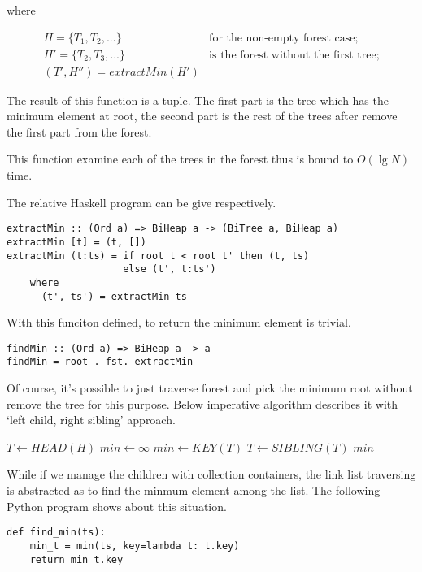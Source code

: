 \documentclass{article}
\begin{document}
where

\[
  \begin{array}{lr}
  H = \{ T_1, T_2, ...\} & \text{for the non-empty forest case;} \\
  H' = \{ T_2, T_3, ...\} & \text{is the forest without the first tree;} \\
  (T', H'') = extractMin(H')
  \end{array}
\]

The result of this function is a tuple. The first part is the 
tree which has the minimum element at root, the second part is
the rest of the trees after remove the first part from the forest.

This function examine each of the trees in the forest thus is bound
to $O(\lg N)$ time.

The relative Haskell program can be give respectively.

\lstset{language=Haskell}
\begin{lstlisting}
extractMin :: (Ord a) => BiHeap a -> (BiTree a, BiHeap a)
extractMin [t] = (t, [])
extractMin (t:ts) = if root t < root t' then (t, ts) 
                    else (t', t:ts')
    where
      (t', ts') = extractMin ts
\end{lstlisting}

With this funciton defined, to return the minimum element is trivial.

\begin{lstlisting}
findMin :: (Ord a) => BiHeap a -> a
findMin = root . fst. extractMin
\end{lstlisting}

Of course, it's possible to just traverse forest and pick the
minimum root without remove the tree for this purpose. Below
imperative algorithm describes it with `left child, right sibling' 
approach.

\begin{algorithmic}[1]
  \State $T \gets HEAD(H)$
  \State $min \gets \infty$
      \State $min \gets KEY(T)$
    \EndIf
    \State $T \gets SIBLING(T)$
  \EndWhile
  \State \Return $min$
\EndFunction
\end{algorithmic}

While if we manage the children with collection containers, the link
list traversing is abstracted as to find the minmum element among the list.
The following Python program shows about this situation.

\lstset{language=Python}
\begin{lstlisting}
def find_min(ts):
    min_t = min(ts, key=lambda t: t.key)
    return min_t.key
\end{lstlisting}
\end{document}
